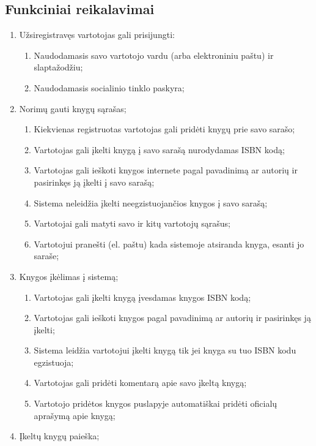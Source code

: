 \documentclass{VUMIFPSkursinis}
\begin{document}
\subsection{Funkciniai reikalavimai}
	\begin{enumerate}[label=\textbf{FR\arabic*}]
		\item Užsiregistravęs vartotojas gali prisijungti:
			\begin{enumerate}[label*=\textbf{.\arabic*}]
				\item Naudodamasis savo vartotojo vardu (arba elektroniniu paštu) ir slaptažodžiu;
				\item Naudodamasis socialinio tinklo paskyra;
			\end{enumerate}
		\item Norimų gauti knygų sąrašas;
			\begin{enumerate}[label*=\textbf{.\arabic*}]
				\item Kiekvienas registruotas vartotojas gali pridėti knygų prie savo sarašo;
				\item Vartotojas gali įkelti knygą į savo sarašą nurodydamas ISBN kodą;
				\item Vartotojas gali ieškoti knygos internete pagal pavadinimą ar autorių ir 
					pasirinkęs ją įkelti į savo sarašą;
				\item Sistema neleidžia įkelti neegzistuojančios knygos į savo sarašą;
				\item Vartotojai gali matyti savo ir kitų vartotojų sąrašus;
				\item Vartotojui pranešti (el. paštu) kada sistemoje atsiranda knyga, esanti jo saraše;
		    \end{enumerate}
		\item Knygos įkėlimas į sistemą;
			\begin{enumerate}[label*=\textbf{.\arabic*}]
				\item Vartotojas gali įkelti knygą įvesdamas knygos ISBN kodą;
				\item Vartotojas gali ieškoti knygos pagal pavadinimą ar autorių ir 
					pasirinkęs ją įkelti;
				\item Sistema leidžia vartotojui įkelti knygą tik jei knyga su tuo ISBN kodu egzistuoja;
				\item Vartotojas gali pridėti komentarą apie savo įkeltą knygą;
				\item Vartotojo pridėtos knygos puslapyje automatiškai pridėti oficialų aprašymą apie knygą;
			\end{enumerate}
		\item Įkeltų knygų paieška;

\end{enumerate}
\end{document}
